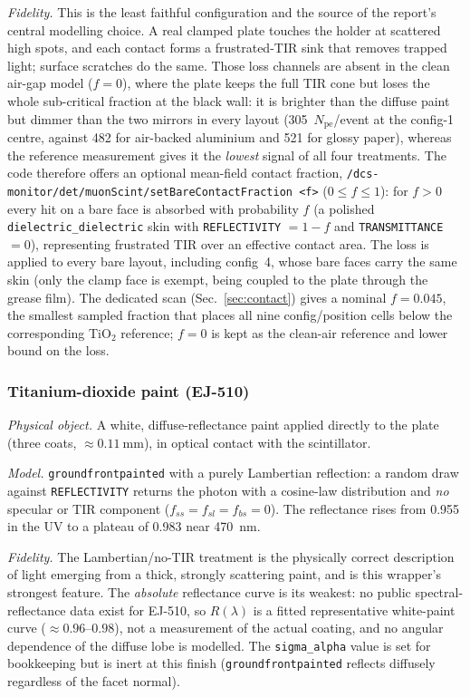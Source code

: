 \documentclass[11pt,a4paper]{article}
\newcommand{\pe}{\ensuremath{N_{\mathrm{pe}}}}
\begin{document}
\emph{Fidelity.} This is the least faithful configuration and the source of the
report's central modelling choice. A real clamped plate touches the holder at
scattered high spots, and each contact forms a frustrated-TIR sink that removes
trapped light; surface scratches do the same. Those loss channels are absent in
the clean air-gap model ($f=0$), where the plate keeps the full TIR cone but
loses the whole sub-critical fraction at the black wall: it is brighter than
the diffuse paint but dimmer than the two mirrors in every layout
(\num{305}~\pe/event at the config-1 centre, against \num{482} for air-backed
aluminium and \num{521} for glossy paper), whereas the reference
measurement gives it the \emph{lowest} signal of all four treatments. The code
therefore offers an optional mean-field contact fraction,
\texttt{/dcs-monitor/det/muonScint/setBareContactFraction <f>}
($0\le f\le 1$): for $f>0$ every hit on a bare face is absorbed with probability
$f$ (a polished \texttt{dielectric\_dielectric} skin with
\texttt{REFLECTIVITY} $=1-f$ and \texttt{TRANSMITTANCE} $=0$), representing
frustrated TIR over an effective contact area. The loss is applied to every
bare layout, including config~4, whose bare faces carry the same skin (only the
clamp face is exempt, being coupled to the plate through the grease film). The
dedicated scan
(Sec.~\ref{sec:contact}) gives a nominal
$f=\num{0.045}$, the smallest sampled fraction that places all nine
config/position cells below the corresponding TiO$_2$ reference; $f=0$ is kept
as the clean-air reference and lower bound on the loss.

\subsubsection{Titanium-dioxide paint (EJ-510)}
\label{sec:refl-tio2}

\emph{Physical object.} A white, diffuse-reflectance paint applied directly to
the plate (three coats, $\approx\SI{0.11}{\milli\meter}$), in optical contact
with the scintillator.

\emph{Model.} \texttt{groundfrontpainted} with a purely Lambertian reflection: a
random draw against \texttt{REFLECTIVITY} returns the photon with a cosine-law
distribution and \emph{no} specular or TIR component
($f_{ss}=f_{sl}=f_{bs}=0$). The reflectance rises from \num{0.955} in the UV to
a plateau of \num{0.983} near \SI{470}{\nano\meter}.

\emph{Fidelity.} The Lambertian/no-TIR treatment is the physically correct
description of light emerging from a thick, strongly scattering paint, and is
this wrapper's strongest feature. The \emph{absolute} reflectance curve is its
weakest: no public spectral-reflectance data exist for EJ-510, so $R(\lambda)$
is a fitted representative white-paint curve ($\approx 0.96$--$0.98$), not a
measurement of the actual coating, and no angular dependence of the diffuse
lobe is modelled. The \texttt{sigma\_alpha} value is set for bookkeeping but is
inert at this finish (\texttt{groundfrontpainted} reflects diffusely regardless
of the facet normal).
\end{document}
